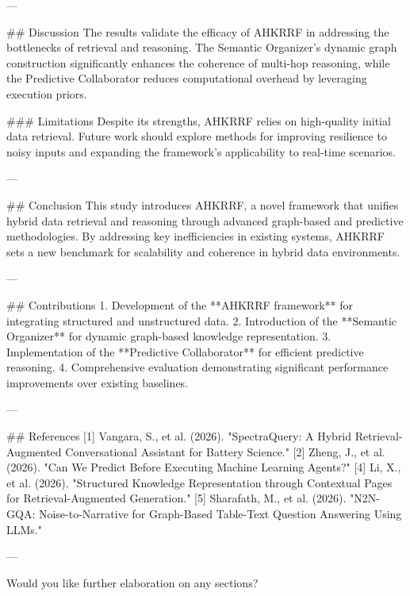 ---

## Discussion
The results validate the efficacy of AHKRRF in addressing the bottlenecks of retrieval and reasoning. The Semantic Organizer's dynamic graph construction significantly enhances the coherence of multi-hop reasoning, while the Predictive Collaborator reduces computational overhead by leveraging execution priors.

### Limitations
Despite its strengths, AHKRRF relies on high-quality initial data retrieval. Future work should explore methods for improving resilience to noisy inputs and expanding the framework's applicability to real-time scenarios.

---

## Conclusion
This study introduces AHKRRF, a novel framework that unifies hybrid data retrieval and reasoning through advanced graph-based and predictive methodologies. By addressing key inefficiencies in existing systems, AHKRRF sets a new benchmark for scalability and coherence in hybrid data environments.

---

## Contributions
1. Development of the **AHKRRF framework** for integrating structured and unstructured data.
2. Introduction of the **Semantic Organizer** for dynamic graph-based knowledge representation.
3. Implementation of the **Predictive Collaborator** for efficient predictive reasoning.
4. Comprehensive evaluation demonstrating significant performance improvements over existing baselines.

---

## References
[1] Vangara, S., et al. (2026). "SpectraQuery: A Hybrid Retrieval-Augmented Conversational Assistant for Battery Science."   
[2] Zheng, J., et al. (2026). "Can We Predict Before Executing Machine Learning Agents?"   
[4] Li, X., et al. (2026). "Structured Knowledge Representation through Contextual Pages for Retrieval-Augmented Generation."   
[5] Sharafath, M., et al. (2026). "N2N-GQA: Noise-to-Narrative for Graph-Based Table-Text Question Answering Using LLMs."  

--- 

Would you like further elaboration on any sections?